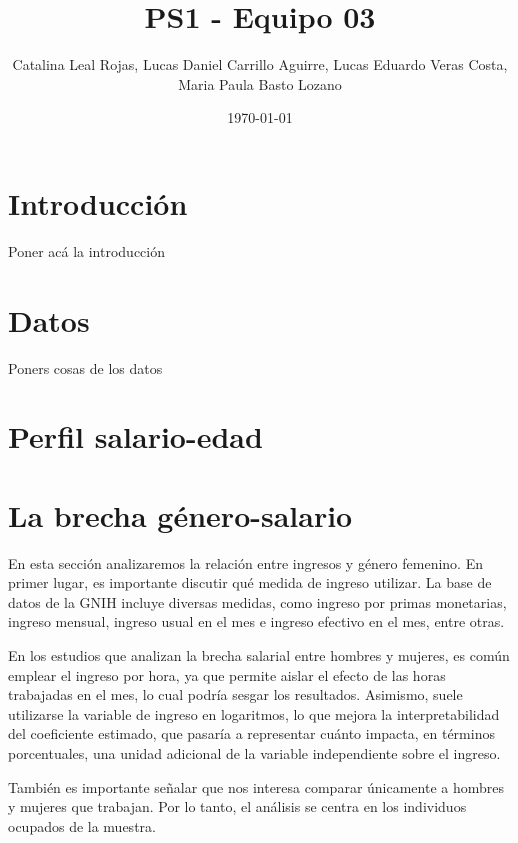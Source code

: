 \documentclass[12pt,a4paper,onecolumn]{article}
\title{PS1 - Equipo 03}
\author{Catalina Leal Rojas, Lucas Daniel Carrillo Aguirre, Lucas Eduardo Veras Costa, Maria Paula Basto Lozano}
\date{\today}
\begin{document}
\maketitle

\thispagestyle{empty} %

%







\section{Introducción} \label{sec:intro}

Poner acá la introducción

\section{Datos}

Poners cosas de los datos

\section{Perfil salario-edad}

\section{ La brecha género-salario}

En esta sección analizaremos la relación entre ingresos y género femenino. 
En primer lugar, es importante discutir qué medida de ingreso utilizar. 
La base de datos de la GNIH incluye diversas medidas, como ingreso por primas monetarias, ingreso mensual, ingreso usual en el mes e ingreso efectivo en el mes, entre otras. 

En los estudios que analizan la brecha salarial entre hombres y mujeres, es común emplear el ingreso por hora, ya que permite aislar el efecto de las horas trabajadas en el mes, lo cual podría sesgar los resultados. 
Asimismo, suele utilizarse la variable de ingreso en logaritmos, lo que mejora la interpretabilidad del coeficiente estimado, que pasaría a representar cuánto impacta, en términos porcentuales, una unidad adicional de la variable independiente sobre el ingreso. 

También es importante señalar que nos interesa comparar únicamente a hombres y mujeres que trabajan. 
Por lo tanto, el análisis se centra en los individuos ocupados de la muestra.
\end{document}
